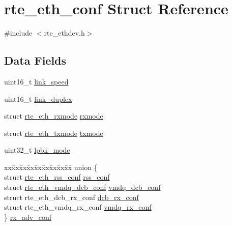 \hypertarget{structrte__eth__conf}{}\section{rte\+\_\+eth\+\_\+conf Struct Reference}
\label{structrte__eth__conf}


{\ttfamily \#include $<$rte\+\_\+ethdev.\+h$>$}

\subsection*{Data Fields}
\begin{DoxyCompactItemize}
\item 
uint16\+\_\+t \hyperlink{structrte__eth__conf_a7d93770cafbfd72bb3bbd1aaec9894ab}{link\+\_\+speed}
\item 
uint16\+\_\+t \hyperlink{structrte__eth__conf_a8a9a73e9e688ae4d72cf319872c0bdf1}{link\+\_\+duplex}
\item 
struct \hyperlink{structrte__eth__rxmode}{rte\+\_\+eth\+\_\+rxmode} \hyperlink{structrte__eth__conf_a346eef99c24f617b74c440c1aa565d01}{rxmode}
\item 
struct \hyperlink{structrte__eth__txmode}{rte\+\_\+eth\+\_\+txmode} \hyperlink{structrte__eth__conf_a1c33c9d2e5cdb14b62ed386bf3159e07}{txmode}
\item 
uint32\+\_\+t \hyperlink{structrte__eth__conf_a51fd0c5d4c2366abf95f7364accf3143}{lpbk\+\_\+mode}
\item 
\begin{tabbing}
xx\=xx\=xx\=xx\=xx\=xx\=xx\=xx\=xx\=\kill
union \{\\
\>struct \hyperlink{structrte__eth__rss__conf}{rte\_eth\_rss\_conf} \hyperlink{structrte__eth__conf_addc9c7bb19ed12f1171c543493553806}{rss\_conf}\\
\>struct \hyperlink{structrte__eth__vmdq__dcb__conf}{rte\_eth\_vmdq\_dcb\_conf} \hyperlink{structrte__eth__conf_a3955257d0cf03d4f49c64e674f132359}{vmdq\_dcb\_conf}\\
\>struct rte\_eth\_dcb\_rx\_conf \hyperlink{structrte__eth__conf_afa63f7644ae1693b8a809ef99cb70d77}{dcb\_rx\_conf}\\
\>struct rte\_eth\_vmdq\_rx\_conf \hyperlink{structrte__eth__conf_a17845d02c4ddfdc09982bd899b6df06e}{vmdq\_rx\_conf}\\
\} \hyperlink{structrte__eth__conf_a4b3455eec163a36fdeda31b65143428b}{rx\_adv\_conf}\\


\end{tabbing}
\end{DoxyCompactItemize}
